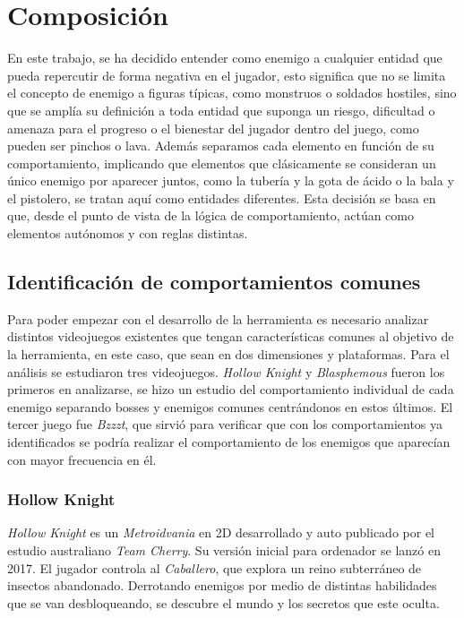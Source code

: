 \section{Composición}
En este trabajo, se ha decidido entender como enemigo a cualquier entidad que pueda repercutir de forma negativa en el jugador, esto significa que no se limita el concepto de enemigo a figuras típicas, como monstruos o soldados hostiles, sino que se amplía su definición a toda entidad que suponga un riesgo, dificultad o amenaza para el progreso o el bienestar del jugador dentro del juego, como pueden ser pinchos o  lava.
Además separamos cada elemento en función de su comportamiento, implicando que elementos que clásicamente se consideran un único enemigo por aparecer juntos, como la tubería y la gota de ácido o la bala y el pistolero, se tratan aquí como entidades diferentes. Esta decisión se basa en que, desde el punto de vista de la lógica de comportamiento, actúan como elementos autónomos y con reglas distintas.\\

\subsection{Identificación de comportamientos comunes}
Para poder empezar con el desarrollo de la herramienta es necesario analizar distintos videojuegos existentes que tengan características comunes al objetivo de la herramienta, en este caso, que sean en dos dimensiones y plataformas.
Para el análisis se estudiaron tres videojuegos. \textit{Hollow Knight} y \textit{Blasphemous} fueron los primeros en analizarse, se hizo un estudio del comportamiento individual de cada enemigo separando bosses y enemigos comunes centrándonos en estos últimos. El tercer juego fue  \textit{Bzzzt}, que sirvió para verificar que con los comportamientos ya identificados se podría realizar el comportamiento de los enemigos que aparecían con mayor frecuencia en él. 

\subsubsection{Hollow Knight}
\textit{Hollow Knight} es un \emph{Metroidvania} en 2D desarrollado y auto publicado por el estudio australiano \emph{Team Cherry}. Su versión inicial para ordenador se lanzó en 2017. El jugador controla al \textit{Caballero}, que explora un reino subterráneo de insectos abandonado. Derrotando enemigos por medio de distintas habilidades que se van desbloqueando, se descubre el mundo y los secretos que este oculta.

